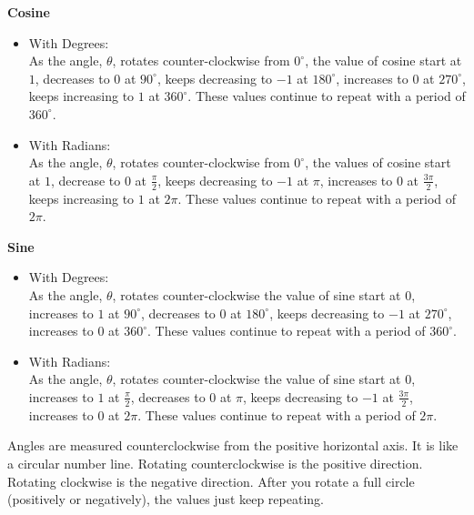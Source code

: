 \documentclass{ximera}
\begin{document}
\begin{idea} \textbf{\textcolor{blue!55!black}{Cosine}}
\begin{itemize}
\item With Degrees: \\
As the angle, $\theta$, rotates counter-clockwise from $0^\circ$, the value of cosine start at $1$, decreases to $0$ at $90^\circ$, keeps decreasing to $-1$ at $180^\circ$, increases to $0$ at $270^\circ$, keeps increasing to $1$ at $360^\circ$.  These values continue to repeat with a period of $360^\circ$.

\item With Radians: \\
As the angle, $\theta$, rotates counter-clockwise from $0^\circ$, the values of cosine start at $1$, decrease to $0$ at $\frac{\pi}{2}$, keeps decreasing to $-1$ at $\pi$, increases to $0$ at $\frac{3\pi}{2}$, keeps increasing to $1$ at $2\pi$.  These values continue to repeat with a period of $2\pi$.
\end{itemize}
\end{idea}



\begin{idea} \textbf{\textcolor{blue!55!black}{Sine}}
\begin{itemize}
\item With Degrees: \\
As the angle, $\theta$, rotates counter-clockwise the value of sine start at $0$, increases to $1$ at $90^\circ$, decreases to $0$ at $180^\circ$, keeps decreasing to $-1$ at $270^\circ$, increases to $0$ at $360^\circ$.  These values continue to repeat with a period of $360^\circ$.

\item With Radians: \\
As the angle, $\theta$, rotates counter-clockwise the value of sine start at $0$, increases to $1$ at $\frac{\pi}{2}$, decreases to $0$ at $\pi$, keeps decreasing to $-1$ at $\frac{3\pi}{2}$, increases to $0$ at $2\pi$.  These values continue to repeat with a period of $2\pi$.
\end{itemize}
\end{idea}



Angles are measured counterclockwise from the positive horizontal axis.  It is like a circular number line.  Rotating counterclockwise is the positive direction.  Rotating clockwise is the negative direction.  After you rotate a full circle (positively or negatively), the values just keep repeating.
\end{document}
